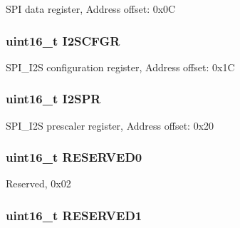 S\-P\-I data register, Address offset\-: 0x0\-C \hypertarget{struct_s_p_i___type_def_acb40abca5ca4cd2b2855adf2186effe8}{
\subsubsection[{I2\-S\-C\-F\-G\-R}]{ uint16\-\_\-t I2\-S\-C\-F\-G\-R}}\label{struct_s_p_i___type_def_acb40abca5ca4cd2b2855adf2186effe8}
S\-P\-I\-\_\-\-I2\-S configuration register, Address offset\-: 0x1\-C \hypertarget{struct_s_p_i___type_def_a02ce1ece243cc4ce1d66ebeca247fee1}{
\subsubsection[{I2\-S\-P\-R}]{ uint16\-\_\-t I2\-S\-P\-R}}\label{struct_s_p_i___type_def_a02ce1ece243cc4ce1d66ebeca247fee1}
S\-P\-I\-\_\-\-I2\-S prescaler register, Address offset\-: 0x20 \hypertarget{struct_s_p_i___type_def_a149feba01f9c4a49570c6d88619f504f}{
\subsubsection[{R\-E\-S\-E\-R\-V\-E\-D0}]{\setlength{\rightskip}{0pt plus 5cm}uint16\-\_\-t R\-E\-S\-E\-R\-V\-E\-D0}}\label{struct_s_p_i___type_def_a149feba01f9c4a49570c6d88619f504f}
Reserved, 0x02 \hypertarget{struct_s_p_i___type_def_a8249a3955aace28d92109b391311eb30}{
\subsubsection[{R\-E\-S\-E\-R\-V\-E\-D1}]{\setlength{\rightskip}{0pt plus 5cm}uint16\-\_\-t R\-E\-S\-E\-R\-V\-E\-D1}}\label{struct_s_p_i___type_def_a8249a3955aace28d92109b391311eb30}
